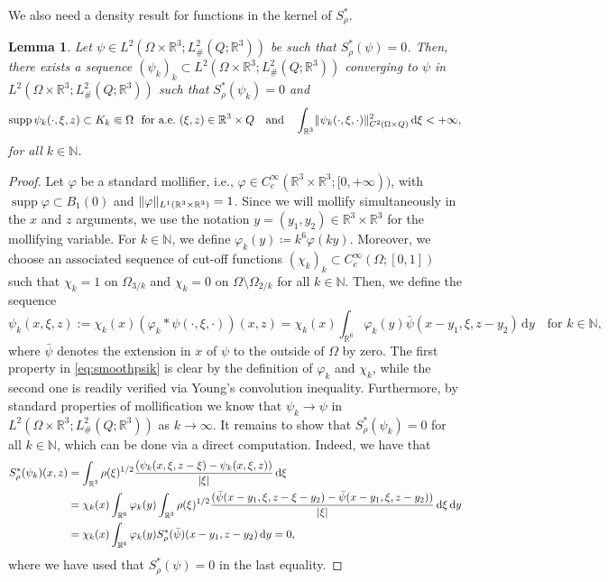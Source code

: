 \documentclass[reqno,11pt]{amsart}
\numberwithin{equation}{section}
\theoremstyle{thmlemcorr}
\numberwithin{theorem}{section}
\newtheorem{lemma}[theorem]{Lemma}
\theoremstyle{thmlemcorr*}
\theoremstyle{defi}
\theoremstyle{remexample}
\theoremstyle{ass}
\newcommand{\N}{\mathbb{N}}
\newcommand{\R}{\mathbb{R}}
\newcommand{\dd}{\,\mathrm{d}}
\DeclarePairedDelimiter{\abs}{\lvert}{\rvert}
\DeclarePairedDelimiter{\norm}{\lVert}{\rVert}
\newcommand{\1}{\mathds{1}}
\DeclareMathOperator{\supp}{supp}
\newcommand{\Om}{\Omega}
\newcommand{\dl}{\,\mathrm{d}}
\newcommand{\seq}[1]{(#1_k)_{k}}
\begin{document}
We also need a density result for functions in the kernel of $S_\rho^*$.
\begin{lemma}\label{le:densitykernel}
    Let $\psi \in L^2(\Omega\times\R^3;L^2_{\#}(Q;\R^3))$ be such that $S_\rho^*(\psi)=0$. Then, there exists a sequence $\seq{\psi} \subset L^2(\Omega\times\R^3;L^2_{\#}(Q;\R^3))$ converging to $\psi$ in $L^2(\Omega\times\R^3;L^2_{\#}(Q;\R^3))$ such that $S_\rho^*(\psi_k)=0$ and
    \begin{equation}\label{eq:smoothpsik}
        \supp \psi_k(\cdot,\xi,z) \subset K_k \Subset \Omega \ \ \text{for a.e.~$(\xi,z) \in \R^3 \times Q$} \quad \text{and} \quad \int_{\R^3}\norm{\psi_k(\cdot,\xi,\cdot)}_{C^2(\Omega \times Q)}^2\dd \xi <+ \infty,
    \end{equation}
    for all $k \in \N$.
\end{lemma}
\begin{proof}
      Let $\varphi$ be a standard 
     mollifier, i.e., \(\varphi\in C_c^\infty(\R^3\times \R^3; [0,+\infty))\), with \(\supp \varphi \subset B_1(0)\) and \(\norm{\varphi}_{L^1(\R^3\times \R^3)}=1\). Since we will mollify simultaneously in the \(x\) and \(z\) arguments, we use the notation \(y=(y_1,y_2)\in \R^3\times\R^3\) for the mollifying variable. For $k \in \N$, we define \(\varphi_k(y)\coloneqq k^{6}\varphi(ky)\). Moreover, we choose an associated sequence of cut-off functions \(\seq{\chi}\subset C_c^\infty(\Om;[0,1])\) such that \(\chi_k= 1\) on \(\Om_{3/k}\) and \(\chi_k=0\) on \(\Om\setminus \Om_{2/k}\) for all $k \in \N$. Then, we define the sequence
     \[
     \psi_k(x,\xi,z):=\chi_k(x) (\varphi_k * \psi(\cdot,\xi,\cdot))(x,z) =  \chi_k(x)\int_{\R^6}\varphi_{k}(y)\bar{\psi}(x-y_1,\xi,z-y_2)\dl y \quad \text{for $k \in \N$,}
     \]
     where \(\bar{\psi}\) denotes the extension in \(x\) of \(\psi\) to the outside of \(\Om\) by zero. The first property in \eqref{eq:smoothpsik} is clear by the definition of $\varphi_{k}$ and $\chi_k$, while the second one is readily verified via Young's convolution inequality. Furthermore, by standard properties of mollification we know that $\psi_k \to \psi$ in $L^2(\Omega\times\R^3;L^2_{\#}(Q;\R^3))$ as $k \to \infty$. It remains to show that $S_\rho^*(\psi_k)=0$ for all $k \in \N$, which can be done via a direct computation. Indeed, we have that
     \begin{align*}
         S_\rho^*(\psi_k)(x,z)&=\int_{\R^3}\rho(\xi)^{1/2}\frac{(\psi_k(x,\xi,z-\xi)-\psi_k(x,\xi,z))}{\abs{\xi}}\dl \xi \\
         &= \chi_k(x) \int_{\R^6} \varphi_k(y)\int_{\R^3}\rho(\xi)^{1/2}\frac{(\bar{\psi}(x-y_1,\xi,z-\xi-y_2)-\bar{\psi}(x-y_1,\xi,z-y_2))}{\abs{\xi}}\dd \xi\dl y \\
         &=\chi_k(x) \int_{\R^6} \varphi_k(y) S_\rho^{*}(\bar{\psi})(x-y_1,z-y_2)\dl y =0,
     \end{align*}
     where we have used that $S_\rho^*(\psi)=0$ in the last equality.
\end{proof}
\end{document}
